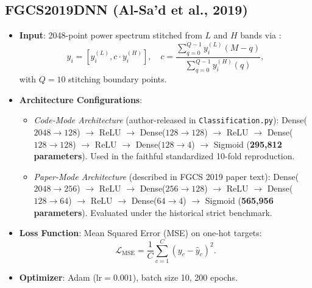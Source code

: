 \documentclass[journal,10pt,twocolumn]{IEEEtran}
\begin{document}
\subsection{FGCS2019DNN (Al-Sa'd et al., 2019)}
\begin{itemize}
    \item \textbf{Input}: 2048-point power spectrum stitched from $L$ and $H$ bands via \cite{alsad2019rf}:
    \begin{equation}
    y_i = [y_i^{(L)}, c \cdot y_i^{(H)}], \quad c = \frac{\sum_{q=0}^{Q-1} y_i^{(L)}(M-q)}{\sum_{q=0}^{Q-1} y_i^{(H)}(q)},
    \label{eq:stitching}
    \end{equation}
    with $Q=10$ stitching boundary points.
    \item \textbf{Architecture Configurations}:
    \begin{itemize}
        \item \textit{Code-Mode Architecture} (author-released in \texttt{Classification.py}): Dense($2048 \rightarrow 128$) $\rightarrow$ ReLU $\rightarrow$ Dense($128 \rightarrow 128$) $\rightarrow$ ReLU $\rightarrow$ Dense($128 \rightarrow 128$) $\rightarrow$ ReLU $\rightarrow$ Dense($128 \rightarrow 4$) $\rightarrow$ Sigmoid (\textbf{295,812 parameters}). Used in the faithful standardized 10-fold reproduction.
        \item \textit{Paper-Mode Architecture} (described in FGCS 2019 paper text): Dense($2048 \rightarrow 256$) $\rightarrow$ ReLU $\rightarrow$ Dense($256 \rightarrow 128$) $\rightarrow$ ReLU $\rightarrow$ Dense($128 \rightarrow 64$) $\rightarrow$ ReLU $\rightarrow$ Dense($64 \rightarrow 4$) $\rightarrow$ Sigmoid (\textbf{565,956 parameters}). Evaluated under the historical strict benchmark.
    \end{itemize}
    \item \textbf{Loss Function}: Mean Squared Error (MSE) on one-hot targets:
    \begin{equation}
    \mathcal{L}_{\text{MSE}} = \frac{1}{C} \sum_{c=1}^C (y_c - \hat{y}_c)^2.
    \label{eq:mse_loss}
    \end{equation}
    \item \textbf{Optimizer}: Adam ($\text{lr} = 0.001$), batch size 10, 200 epochs.
\end{itemize}
\end{document}

